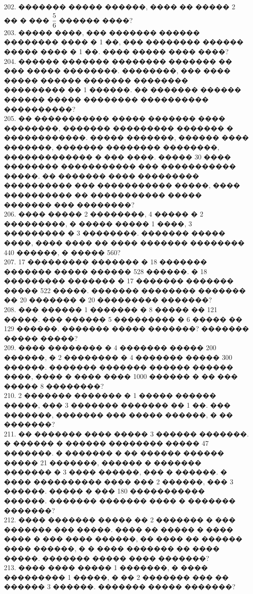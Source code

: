 \documentclass[12pt]{article}
\begin{document}
202. ������� ����� ������, ���� �� ����� 2 �� � ��� $\cfrac{5}{6}$ ������ ����?\\
203. ����� ����, ��� ������� ������ �������� ���� � 1 ��, ��� �������� ������ ����� ���� � 1 ��. ���� ����� ���� ����?\\
204. ������ ������� �������� ������� �� ��� ����� ��������. ��������, ��� ���� ����� ������ ������� �������� ��������� �� 1 ������. �� ������� ������ ������ ����� �������� ���������� ����������?\\
205. �� ����������� ����� ������� ���� ��������, ������� ��������� ������� � ������������. ����� �������, ������ ���� �������, ������� �������� ��������, ������������� � ��� ����. ����� 30 ���� �������� ����������� ��� ����������� �����. �� ������� ���� ��������� ���������� ��� ����������� �����, ���� ���������� �� ����������� ����� ������� ��� ��������?\\
206. ���� ����� 2 ��������, 4 ����� � 2 ���������, � ����� ����� 1 ����, 3 ��������� � 3 ��������. ������� ����� ����, ���� ���� �� ���� ������� �������� 440 ������, � ����� 560?\\
207. 17 ��������� ������� � 18 ������� ������� ����� ������ 528 ������. � 18 ��������� ������� � 17 ������� ������� ����� 522 �����. ������� �������� ������� �� 20 ������� � 20 ��������� �������?\\
208. ��� ������ 1 ������� � 8 ����� �� 121 �����. ��� ������ 5 ��������� � 6 ����� �� 129 ������. ������� ����� �������? ������� ����� �����?\\
209. ���� �������� � 4 ������� ����� 200 ������, � 2 �������� � 4 ������� ����� 300 ������. ������� ������� ������ ������ ����, ���� � ���� ���� 1000 ������ � �� ��� ����� 8 ��������?\\
210. 2 ������� ������� � 1 ����� ������ �����, ��� 3 ������� ������� �� 1 ��. ��� �������, ������� ��� ����� ������, � �� �������?\\
211. �� ������� ���� ����� 3 ������ �������. � ������ � ������ �������� ����� 47 �������. � ������� � �� ������ ������ ����� 21 �������, ������ � ������� ������� � 3 ���� ������, ��� � ������. � ���� ���������� ���� ��� 2 ������, ��� 3 ������. ����� � ��� 180 ����������� ������. ������� ������� ���� � ������� �������?\\
212. ���� ������� ����� �� 2 ������� � ��� ������� ��� �����. ���� �� ����� � ���� ���� � ��� ���� ������, �� ���� �� ������ ���� ������, � � ���� ������� �� ���� �����. ������� ����� ���� �������?\\
213. ���� ���� ����� 1 �������, � ���� ��������� 1 �����, � �� 2 ������� ��� �� ������ 3 ������. ������� ����� �������?\\
\end{document}
